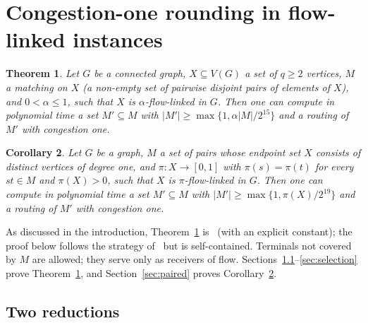 \documentclass[11pt,letterpaper]{article}
\newtheorem{theorem}{Theorem}[section]
\newtheorem{corollary}[theorem]{Corollary}
\theoremstyle{definition}
\begin{document}
\section{Congestion-one rounding in flow-linked instances}\label{sec:rounding}

\begin{theorem}\label{thm:round}
Let $G$ be a connected graph, $X\subseteq V(G)$ a set of $q\ge2$ vertices, $M$ a matching on
$X$ (a non-empty set of pairwise disjoint pairs of elements of $X$), and $0<\alpha\le1$, such
that $X$ is $\alpha$-flow-linked in $G$. Then one can compute in polynomial time a set $M'\subseteq M$
with $|M'|\ge\max\{1,\alpha|M|/2^{15}\}$ and a routing of $M'$ with congestion one.
\end{theorem}

\begin{corollary}\label{cor:paired}
Let $G$ be a graph, $M$ a set of pairs whose endpoint set $X$ consists of distinct vertices of
degree one, and $\pi:X\to[0,1]$ with $\pi(s)=\pi(t)$ for every $st\in M$ and $\pi(X)>0$, such
that $X$ is $\pi$-flow-linked in $G$. Then one can compute in polynomial time a set
$M'\subseteq M$ with $|M'|\ge\max\{1,\pi(X)/2^{19}\}$ and a routing of $M'$ with congestion
one.
\end{corollary}

As discussed in the introduction, Theorem~\ref{thm:round} is~\cite[Theorem~3.1]{CKS05} (with
an explicit constant); the proof below follows the strategy of~\cite[Section~3.4]{CKS13} but
is self-contained. Terminals not covered by $M$ are allowed; they serve only as receivers of
flow. Sections~\ref{sec:reductions}--\ref{sec:selection} prove
Theorem~\ref{thm:round}, and Section~\ref{sec:paired} proves Corollary~\ref{cor:paired}.

\subsection{Two reductions}\label{sec:reductions}
\end{document}
